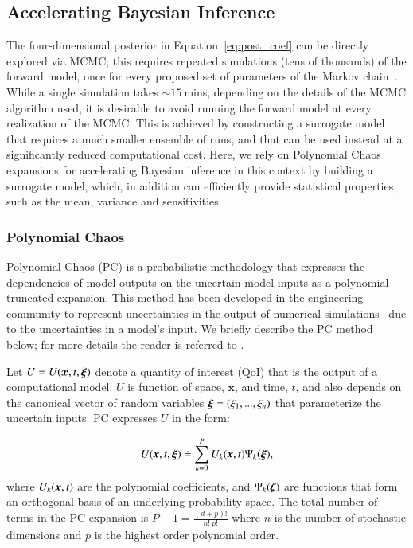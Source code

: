 \subsection{Accelerating Bayesian Inference}
\label{sec:uqpce}

The four-dimensional posterior in Equation~\eqref{eq:post_coef} can be directly
explored via MCMC; this requires repeated simulations (tens of thousands) of the forward \geoclaw model, 
once for every proposed set of parameters of the Markov chain~\cite{MarzoukNajm2009,Malinverno2002}. While a single \geoclaw simulation
takes $\sim 15~$mins, depending on the details of the MCMC algorithm used, it is desirable 
to avoid running the forward model at every realization of the MCMC. This is achieved by constructing a 
surrogate model that requires a much
smaller ensemble of \geoclaw runs, and that can be used instead
at a significantly reduced computational cost.  Here, we rely on
Polynomial Chaos expansions for accelerating Bayesian inference in this context 
by building a surrogate model, which, in addition can efficiently
provide statistical properties, such as the mean, variance and sensitivities. 

\subsubsection{Polynomial Chaos}

Polynomial Chaos (PC) is a probabilistic methodology that expresses the 
dependencies of model outputs on the uncertain model inputs
as a polynomial truncated expansion. This method has been developed in 
the engineering community to represent uncertainties in the output of 
numerical simulations~\citep{Villegas2012,Lin2009,Xiu2004}
due to the uncertainties in a model's input. We briefly describe the PC
method below; for more details 
the reader is referred to \citep{LeMaitreKnio2010}.

Let $U=U(\bm{x},t,\xxi)$ denote a quantity of 
interest (QoI) that is the output of a computational model.
$U$ is function of space, $\bm{x}$, and time, $t$, and 
also depends on the canonical vector of random variables $\xxi=(\xi_1,...,\xi_n)$
that parameterize the uncertain inputs. 
PC expresses $U$ in the form:

\begin{equation}
  U(\xbold,t,\xxi) \doteq \sum_{k = 0}^P U_k(\xbold,t) \Psi_k(\xxi),
\label{eq:stochseries}
\end{equation} 
where $U_k(\xbold,t)$ are the polynomial coefficients, and
$\Psi_k(\xxi)$ are functions that form an orthogonal basis of an underlying probability
space. The total number of terms in the PC expansion is
$P+1 = \frac{(d+p)! }{n!\ p!}$ where $n$ is the number of stochastic dimensions and $p$ is the highest order
polynomial order. 

